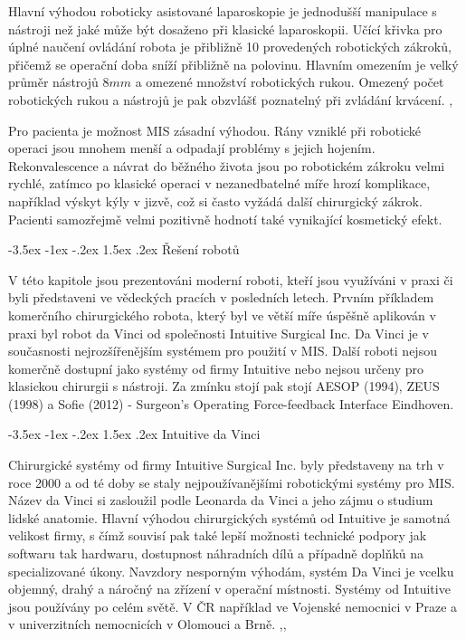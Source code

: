 \documentclass[10pt, a4paper]{article}
\makeatletter
\theoremstyle{definition}
\renewcommand\section{\@startsection {section}{1}{\z@}%
                                   {-3.5ex \@plus -1ex \@minus -.2ex}%
                                   {1.5ex \@plus.2ex}%
                                   {\large\bfseries}}
\renewcommand\subsection{\@startsection {subsection}{1}{\z@}%
                                   {-3.5ex \@plus -1ex \@minus -.2ex}%
                                   {1.5ex \@plus.2ex}%
                                   {\normalsize\bfseries}}
\makeatother
\begin{document}
Hlavní výhodou roboticky asistované laparoskopie je jednodušší
manipulace s nástroji než jaké může být dosaženo při klasické laparoskopii.
Učící křivka pro úplné naučení ovládání robota je přibližně 10 provedených robotických
zákroků, přičemž se operační doba sníží přibližně na polovinu. Hlavním omezením je velký průměr
nástrojů $8mm$ a omezené množství robotických rukou. Omezený počet
robotických rukou a nástrojů je pak obzvlášť poznatelný při zvládání krvácení. \cite{plusminus},\cite{robot_vs_video}

Pro pacienta je možnost MIS zásadní výhodou. Rány vzniklé při robotické operaci
jsou mnohem menší a odpadají problémy s jejich hojením. 
Rekonvalescence a návrat do běžného života jsou po robotickém zákroku velmi rychlé, 
zatímco po klasické operaci v nezanedbatelné míře hrozí komplikace, například výskyt kýly v jizvě, 
což si často vyžádá další chirurgický zákrok. 
Pacienti samozřejmě velmi pozitivně hodnotí také vynikající kosmetický efekt. \cite{mis_hom}


\section{Řešení robotů}
\label{sec:robot}

V této kapitole jsou prezentováni moderní roboti, kteří jsou využíváni v praxi
či byli představeni ve vědeckých pracích v posledních letech.
Prvním příkladem komerčního chirurgického robota, který byl ve větší míře
úspěšně aplikován v praxi byl robot da Vinci od společnosti Intuitive Surgical Inc.
Da Vinci je v současnosti nejrozšířenějším systémem pro použití v MIS.
Další roboti nejsou komerčně dostupní jako
systémy od firmy Intuitive nebo nejsou určeny pro klasickou chirurgii s nástroji.
Za zmínku stojí pak stojí AESOP (1994), ZEUS (1998) a Sofie (2012) - Surgeon's Operating Force-feedback Interface Eindhoven.\cite{wiki}

\subsection{Intuitive da Vinci}
\label{subsec:da_vinci}

Chirurgické systémy od firmy Intuitive Surgical Inc. byly představeny na trh v roce 2000
a od té doby se staly nejpoužívanějšími robotickými systémy pro MIS.
Název da Vinci si zasloužil podle Leonarda da Vinci a jeho zájmu o
studium lidské anatomie.
Hlavní výhodou chirurgických systémů od Intuitive 
je samotná velikost firmy, s čímž souvisí pak také lepší možnosti
technické podpory jak softwaru tak hardwaru, dostupnost náhradních dílů
a případně doplňků na specializované úkony.
Navzdory nesporným výhodám, systém Da Vinci je vcelku objemný, drahý a
náročný na zřízení v operační místnosti.
Systémy od Intuitive jsou používány po celém světě. V ČR
například ve Vojenské nemocnici v Praze a v univerzitních nemocnicích
v Olomouci a Brně. \cite{mis_thesis},\cite{intuitive},\cite{mis_kraj}
\end{document}
